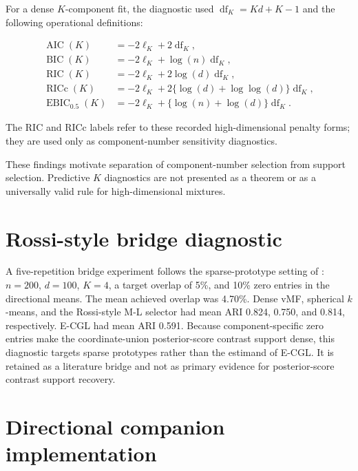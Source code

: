 \documentclass[preprint,12pt,authoryear]{elsarticle}
\begin{document}
For a dense $K$-component fit, the diagnostic used
$\operatorname{df}_K=Kd+K-1$ and the following operational definitions:

\[
\begin{aligned}
\operatorname{AIC}(K)&=-2\ell_K+2\operatorname{df}_K,\\
\operatorname{BIC}(K)&=-2\ell_K+\log(n)\operatorname{df}_K,\\
\operatorname{RIC}(K)&=-2\ell_K+2\log(d)\operatorname{df}_K,\\
\operatorname{RICc}(K)&=-2\ell_K+2\{\log(d)+\log\log(d)\}\operatorname{df}_K,\\
\operatorname{EBIC}_{0.5}(K)&=-2\ell_K+\{\log(n)+\log(d)\}\operatorname{df}_K.
\end{aligned}
\]

The RIC and RICc labels refer to these recorded high-dimensional penalty
forms; they are used only as component-number sensitivity diagnostics.

These findings motivate separation of component-number selection from support
selection. Predictive $K$ diagnostics are not presented as a theorem or as a
universally valid rule for high-dimensional mixtures.

\section{Rossi-style bridge diagnostic}
\label{sec:s-rossi-bridge}

A five-repetition bridge experiment follows the sparse-prototype setting of
\citet{rossi2022sparsevmf}: $n=200$, $d=100$, $K=4$, a target overlap of 5\%, and
10\% zero entries in the directional means. The mean achieved overlap was
4.70\%. Dense vMF, spherical $k$-means, and the Rossi-style M-L selector had mean
ARI 0.824, 0.750, and 0.814, respectively. E-CGL had mean ARI 0.591. Because
component-specific zero entries make the coordinate-union posterior-score contrast support
dense, this diagnostic targets sparse prototypes rather than the estimand of
E-CGL. It is retained as a literature bridge and not as primary evidence for
posterior-score contrast support recovery.

\section{Directional companion implementation}
\label{sec:s-target-diagnostic}
\end{document}
